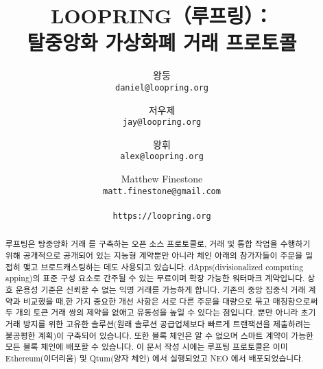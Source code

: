 \documentclass{article}
\title{\textbf{LOOPRING（루프링）：\\ 탈중앙화 가상화폐 거래 프로토콜}}
\author{	
	왕둥\\	
	\texttt{daniel@loopring.org}\\	
	\and	
	저우제\\	
	\texttt{jay@loopring.org}\\	
	\and	
	왕휘\\	
	\texttt{alex@loopring.org}\\	
	\and	
	Matthew Finestone\\	
	\texttt{matt.finestone@gmail.com}\\	
	\\	
	\texttt{https://loopring.org}	
}
\begin{document}
\maketitle
\begin{abstract}
	
	 루프팅은 탕중앙화 거래 를 구축하는 오픈 소스 프로토콜로, 거래 및 통합 작업을 수행하기 위해 공개적으로 공개되어 있는 지능형 계약뿐만 아니라 체인 아래의 참가자들이 주문을 밀접히 맺고 브로드캐스팅하는 데도 사용되고 있습니다. dApps(divisionalized computing apping)의 표준 구성 요소로 간주될 수 있는 무료이며 확장 가능한 워터마크 계약입니다. 상호 운용성 기준은 신뢰할 수 없는 익명 거래를 가능하게 합니다. 기존의 중앙 집중식 거래 계약과 비교했을 때,한 가지 중요한 개선 사항은 서로 다른 주문을 대량으로 묶고 매칭함으로써 두 개의 토큰 거래 쌍의 제약을 없애고 유동성을 높일 수 있다는 점입니다. 뿐만 아니라 초기 거래 방지를 위한 고유한 솔루션(원래 솔루션 공급업체보다 빠르게 트랜잭션을 제출하려는 불공평한 계획)이 구축되어 있습니다. 또한 블록 체인은 알 수 없으며 스마트 계약이 가능한 모든 블록 체인에 배포할 수 있습니다. 이 문서 작성 시에는 루프팅 프로토콜은 이미 Ethereum(이더리움) \cite{buterin2017ethereum} \cite{wood2014ethereum} 및 Qtum(양자 체인) \cite{dai2017smart}에서 실행되었고 NEO \cite{atterlonn2018distributed}에서 배포되었습니다.
	
\end{abstract}
\end{document}
